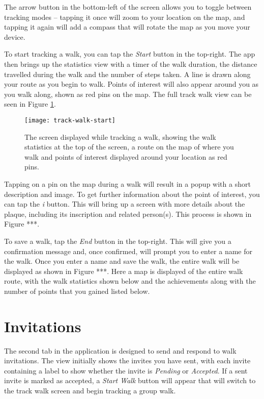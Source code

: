 The arrow button in the bottom-left of the screen allows you to toggle between tracking modes -- tapping it once will zoom to your location on the map, and tapping it again will add a compass that will rotate the map as you move your device.

To start tracking a walk, you can tap the \textit{Start} button in the top-right. The app then brings up the statistics view with a timer of the walk duration, the distance travelled during the walk and the number of steps taken. A line is drawn along your route as you begin to walk. Points of interest will also appear around you as you walk along, shown as red pins on the map. The full track walk view can be seen in Figure \ref{fig:track-walk-start}.

\begin{figure}[hbt]
  \centering
  \texttt{[image: track-walk-start]}
  \caption{The screen displayed while tracking a walk, showing the walk statistics at the top of the screen, a route on the map of where you walk and points of interest displayed around your location as red pins.}
  \label{fig:track-walk-start}
\end{figure}


Tapping on a pin on the map during a walk will result in a popup with a short description and image. To get further information about the point of interest, you can tap the \textit{i} button. This will bring up a screen with more details about the plaque, including its inscription and related person(s). This process is shown in Figure ***.

To save a walk, tap the \textit{End} button in the top-right. This will give you a confirmation message and, once confirmed, will prompt you to enter a name for the walk. Once you enter a name and save the walk, the entire walk will be displayed as shown in Figure ***. Here a map is displayed of the entire walk route, with the walk statistics shown below and the achievements along with the number of points that you gained listed below.

\section{Invitations}

The second tab in the application is designed to send and respond to walk invitations. The view initially shows the invites you have sent, with each invite containing a label to show whether the invite is \textit{Pending} or \textit{Accepted}. If a sent invite is marked as accepted, a \textit{Start Walk} button will appear that will switch to the track walk screen and begin tracking a group walk.

